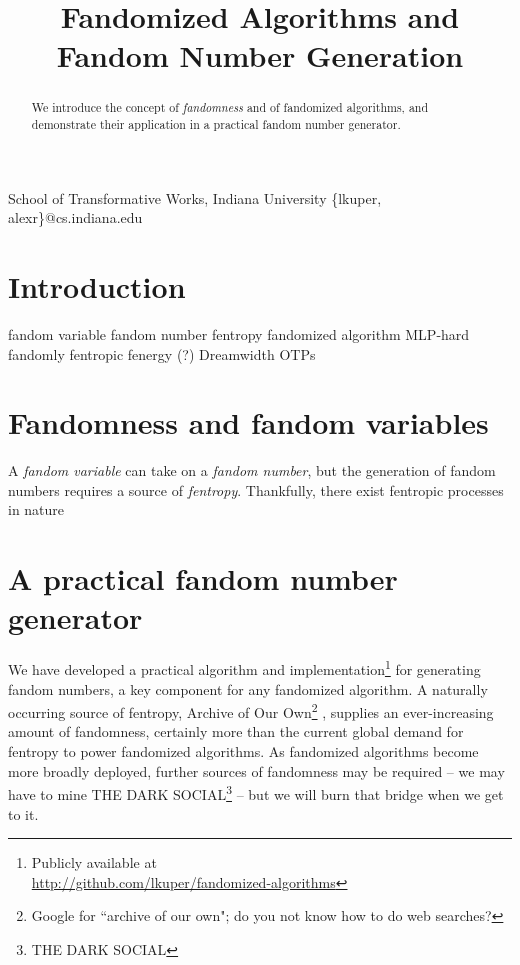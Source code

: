 \documentclass[9pt]{sigplanconf}
\begin{document}
\title{Fandomized Algorithms and Fandom Number Generation}

           {School of Transformative Works, Indiana University}
           {\{lkuper, alexr\}@cs.indiana.edu}

\maketitle

\begin{abstract}
We introduce the concept of \emph{fandomness} and of fandomized algorithms, and
demonstrate their application in a practical fandom number generator.
\end{abstract}

\section{Introduction}

fandom variable
fandom number
fentropy
fandomized algorithm
MLP-hard
fandomly
fentropic
fenergy (?)
Dreamwidth
OTPs

\section{Fandomness and fandom variables}

A \emph{fandom variable} can take on a \emph{fandom number}, but the
generation of fandom numbers requires a source of
\emph{fentropy}. Thankfully, there exist fentropic processes in nature

\section{A practical fandom number generator}
We have developed a practical algorithm and implementation\footnote{Publicly
available at \\
\url{http://github.com/lkuper/fandomized-algorithms}} for
generating fandom numbers, a key component for any fandomized
algorithm. A naturally occurring source of fentropy, Archive of Our
Own\footnote{Google for ``archive of our own"; do you not know how to
  do web searches?\footnotemark}
, supplies an
ever-increasing amount of fandomness, certainly more than the current
global demand for fentropy to power fandomized algorithms. As
fandomized algorithms become more broadly deployed, further sources of
fandomness may be required -- we may have to mine THE DARK
SOCIAL\footnote{THE DARK SOCIAL} -- but we will burn that bridge when
we get to it.
\end{document}
